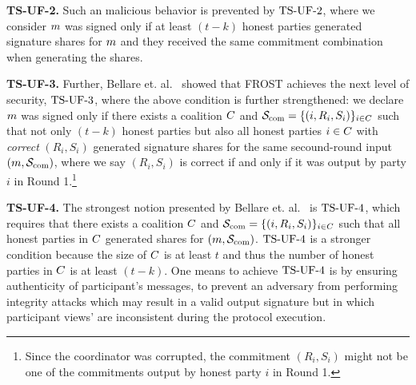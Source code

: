 
\medskip

\textbf{TS-UF-2.}
Such an malicious behavior is prevented by $\mathrm{TS}\mbox{-}\mathrm{UF}\mbox{-}{2}$, where
we consider $m$ was signed only if at least $(t - k)$ honest parties generated signature shares for $m$ and they received the same commitment combination when generating the shares.

\medskip

\textbf{TS-UF-3.} Further, Bellare et. al.~\cite{BellareCKMTZ22} showed that FROST achieves the next level of security, $\mathrm{TS}\mbox{-}\mathrm{UF}\mbox{-}{3}$, where the above condition is further strengthened:
we declare $m$ was signed only if there exists a coalition $C$ and $\mathcal{S}_{\rm com}=\{ (i, R_{i}, S_{i})\}_{i \in C}$ such that not only $(t - k)$ honest parties but also all honest parties $i\in C$ with \emph{correct} $(R_{i}, S_{i})$ generated signature shares for the same secound-round input $(m, \mathcal{S}_{\rm com})$, where we say $(R_{i}, S_{i})$ is correct if and only if it was output by party $i$ in Round 1.\footnote{Since the coordinator was corrupted, the commitment $(R_{i}, S_{i})$ might not be one of the commitments output by honest party $i$ in Round 1.}


\medskip

\textbf{TS-UF-4.}
The strongest notion presented by Bellare et. al.~\cite{BellareCKMTZ22} is $\mathrm{TS}\mbox{-}\mathrm{UF}\mbox{-}{4}$, which requires that there exists a coalition $C$ and $\mathcal{S}_{\rm com}=\{ (i, R_{i}, S_{i})\}_{i \in C}$ such that all honest parties in $C$ generated shares for $(m, \mathcal{S}_{\rm com})$.
$\mathrm{TS}\mbox{-}\mathrm{UF}\mbox{-}{4}$ is a stronger condition because the size of $C$ is at least $t$ and thus the number of honest parties in $C$ is at least $(t - k)$.
One means to achieve $\mathrm{TS}\mbox{-}\mathrm{UF}\mbox{-}{4}$ is by ensuring authenticity of participant's messages,
to prevent an adversary from performing integrity attacks which may result in a valid output signature but in which participant views' are inconsistent during the protocol execution.

